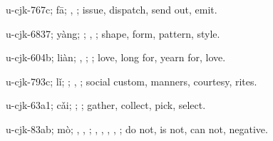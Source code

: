 \begin{multicols}{2}
{\cjkgGlue{}u-cjk-767c; fā; \cjkgGlue{}, \cjkgGlue{}; issue, dispatch, send out, emit.

\cjkgGlue{}u-cjk-6837; yàng; \cjkgGlue{}; \cjkgGlue{}, \cjkgGlue{}; shape, form, pattern, style.

\cjkgGlue{}u-cjk-604b; liàn; \cjkgGlue{}\cjkgGlue{}\cjkgGlue{}, \cjkgGlue{}\cjkgGlue{}\cjkgGlue{}; \cjkgGlue{}; love, long for, yearn for, love.

\cjkgGlue{}u-cjk-793c; lǐ; \cjkgGlue{}; \cjkgGlue{}, \cjkgGlue{}; social custom, manners, courtesy, rites.

\cjkgGlue{}u-cjk-63a1; cǎi; \cjkgGlue{}\cjkgGlue{}\cjkgGlue{}; \cjkgGlue{}; gather, collect, pick, select.

\cjkgGlue{}u-cjk-83ab; mò; \cjkgGlue{}, \cjkgGlue{}\cjkgGlue{}\cjkgGlue{}, \cjkgGlue{}; \cjkgGlue{}, \cjkgGlue{}, \cjkgGlue{}, \cjkgGlue{}, \cjkgGlue{}; do not, is not, can not, negative.

}
\end{multicols}
